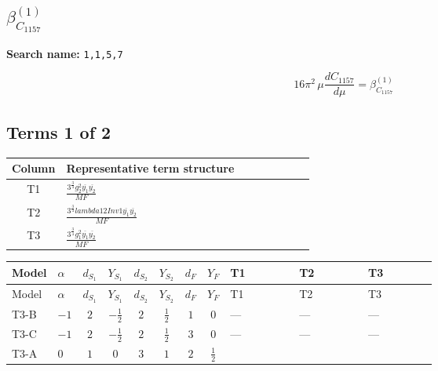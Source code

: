 \documentclass[8pt]{article}
\begin{document}
\begin{landscape}
\section*{$\beta_{C_{1157}}^{(1)}$}
\noindent\textbf{Search name: }\texttt{1,1,5,7}\par\smallskip
\[16\pi^2\,\mu\frac{d C_{1157}}{d\mu}=\beta_{C_{1157}}^{(1)}\]
\subsection*{Terms 1 of 2}
\begin{center}
\begin{tabular}{@{}c >{\raggedright\arraybackslash}p{0.82\linewidth}@{}}
\toprule
Column & Representative term structure \\
\midrule
T1 & \(\displaystyle \frac{3^{\frac{3}{4}} g_{2}^{2} \overline{y_{1}} \overline{y_{2}}}{MF}\) \\
\midrule
T2 & \(\displaystyle \frac{3^{\frac{3}{4}} lambda12Inv1 \overline{y_{1}} \overline{y_{2}}}{MF}\) \\
\midrule
T3 & \(\displaystyle \frac{3^{\frac{3}{4}} g_{1}^{2} \overline{y_{1}} \overline{y_{2}}}{MF}\) \\
\midrule
\bottomrule
\end{tabular}
\end{center}
\smallskip
\tiny
\begin{longtable}{@{}llcccccc >{\raggedright\arraybackslash}p{0.21\linewidth} >{\raggedright\arraybackslash}p{0.21\linewidth} >{\raggedright\arraybackslash}p{0.21\linewidth}@{}}
\toprule
Model & $\alpha$ & $d_{S_1}$ & $Y_{S_1}$ & $d_{S_2}$ & $Y_{S_2}$ & $d_F$ & $Y_F$ & T1 & T2 & T3 \\
\midrule
\endfirsthead
\toprule
Model & $\alpha$ & $d_{S_1}$ & $Y_{S_1}$ & $d_{S_2}$ & $Y_{S_2}$ & $d_F$ & $Y_F$ & T1 & T2 & T3 \\
\midrule
\endhead
T3-B & $-1$ & $2$ & $-\frac{1}{2}$ & $2$ & $\frac{1}{2}$ & $1$ & $0$ & --- & --- & --- \\
\midrule
T3-C & $-1$ & $2$ & $-\frac{1}{2}$ & $2$ & $\frac{1}{2}$ & $3$ & $0$ & --- & --- & --- \\
\midrule
T3-A & $0$ & $1$ & $0$ & $3$ & $1$ & $2$ & $\frac{1}{2}$ & \scriptsize\adjustbox{max width=\linewidth}{$\begin{gathered} - \frac{11 \cdot 3^{\frac{3}{4}} g_{2}^{2} \overline{y_{1}} \overline{y_{2}}}{8 MF}\end{gathered}$} & \scriptsize\adjustbox{max width=\linewidth}{$\begin{gathered} - \frac{3^{\frac{3}{4}} lambda12Inv1 \overline{y_{1}} \overline{y_{2}}}{6 MF}\end{gathered}$} & \scriptsize\adjustbox{max width=\linewidth}{$\begin{gathered} - \frac{3^{\frac{3}{4}} g_{1}^{2} \overline{y_{1}} \overline{y_{2}}}{8 MF}\end{gathered}$} \\

\end{longtable}
\end{landscape}
\end{document}
